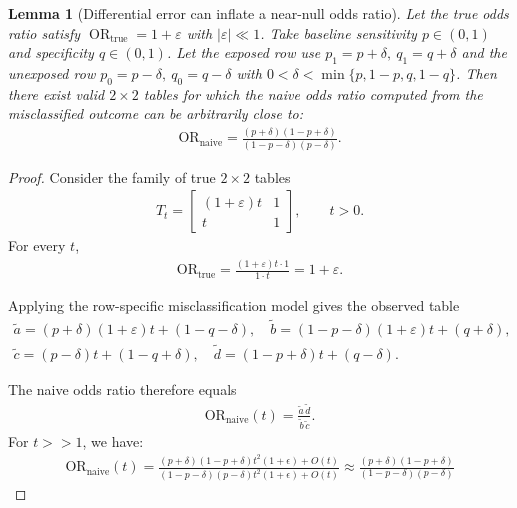 \documentclass[pdflatex,sn-mathphys-num]{sn-jnl}%
\def\EQSP{3pt}
\newcommand{\cgather}[2][\EQSP]{\begingroup\setlength\abovedisplayskip{#1}\setlength\belowdisplayskip{#1}\begin{gather} #2 \end{gather}\endgroup\noindent}
\theoremstyle{thmstyleone}%
\newtheorem{lemma}[theorem]{Lemma} %
\theoremstyle{thmstyletwo}%
\theoremstyle{thmstylethree}%
\begin{document}
\begin{lemma}[Differential error can inflate a near-null odds ratio]\label{lem:minimal}
Let the true odds ratio satisfy $\operatorname{OR}_{\mathrm{true}}=1+\varepsilon$
with $|\varepsilon|\ll1$.
Take baseline sensitivity $p\in(0,1)$ and specificity $q\in(0,1)$.
Let the exposed row use $p_1=p+\delta,\ q_1=q+\delta$ and the unexposed row
$p_0=p-\delta,\ q_0=q-\delta$ with $0<\delta<\min\{p,1-p,q,1-q\}$.
%
Then there exist valid $2\times2$ tables for which the naive odds ratio computed from the misclassified outcome
can be arbitrarily close to:
\cgather{
\mathrm{OR}_{\mathrm{naive}}
=
\frac{(p+\delta)(1-p+\delta)}{(1-p-\delta)(p-\delta)} .
}
\end{lemma}
\begin{proof}
Consider the family of true $2\times2$ tables
\cgather{
T_t=
\begin{bmatrix}
(1+\varepsilon)t & 1\\
t & 1
\end{bmatrix},
\qquad t>0.
}
For every $t$,
\cgather{
\mathrm{OR}_{\mathrm{true}}
=
\frac{(1+\varepsilon)t\cdot 1}{1\cdot t}
=
1+\varepsilon .
}

Applying the row-specific misclassification model gives the observed table
\cgather{
\tilde a=(p+\delta)(1+\varepsilon)t+(1-q-\delta),\quad
\tilde b=(1-p-\delta)(1+\varepsilon)t+(q+\delta),\\
\tilde c=(p-\delta)t+(1-q+\delta),\quad
\tilde d=(1-p+\delta)t+(q-\delta).
}

The naive odds ratio therefore equals
\cgather{
\mathrm{OR}_{\text{naive}}(t)
=
\frac{\tilde a\,\tilde d}{\tilde b\,\tilde c}.
}
For $t>>1$, we have:
\cgather{
  \mathrm{OR}_{\text{naive}}(t)
= \frac{(p+\delta)(1-p+\delta)t^2(1+\epsilon)+O(t)}{(1-p-\delta)(p-\delta)t^2(1+\epsilon)+O(t)}
\approx  \frac{(p+\delta)(1-p+\delta)}{(1-p-\delta)(p-\delta)} }

\end{proof}
\end{document}
